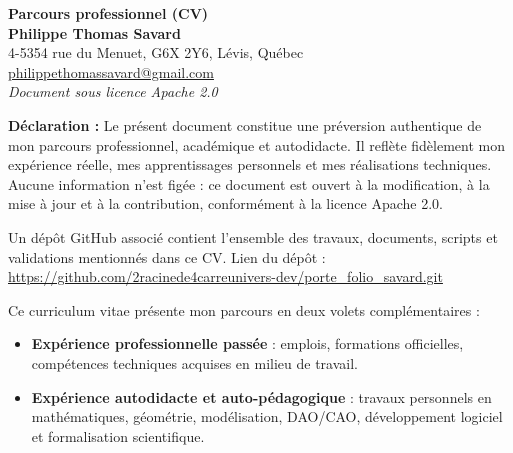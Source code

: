 \documentclass[11pt,a4paper]{article}
\begin{document}
\begin{center}
    {\LARGE \textbf{Parcours professionnel (CV)}}\\[0.5cm]

    \textbf{Philippe Thomas Savard}\\
    4-5354 rue du Menuet, G6X 2Y6, Lévis, Québec\\
    \href{mailto:philippethomassavard@gmail.com}{philippethomassavard@gmail.com}\\[0.3cm]

    \textit{Document sous licence Apache 2.0}\\[0.5cm]
\end{center}

\noindent
\textbf{Déclaration :}  
Le présent document constitue une préversion authentique de mon parcours professionnel, académique et autodidacte.  
Il reflète fidèlement mon expérience réelle, mes apprentissages personnels et mes réalisations techniques.  
Aucune information n’est figée : ce document est ouvert à la modification, à la mise à jour et à la contribution,  
conformément à la licence Apache 2.0.

Un dépôt GitHub associé contient l’ensemble des travaux, documents, scripts et validations mentionnés dans ce CV.  
Lien du dépôt : \url{https://github.com/2racinede4carreunivers-dev/porte_folio_savard.git}

\vspace{0.8cm}

\noindent
Ce curriculum vitae présente mon parcours en deux volets complémentaires :

\begin{itemize}
    \item \textbf{Expérience professionnelle passée} : emplois, formations officielles, compétences techniques acquises en milieu de travail.
    \item \textbf{Expérience autodidacte et auto-pédagogique} : travaux personnels en mathématiques, géométrie, modélisation, DAO/CAO,  
    développement logiciel et formalisation scientifique.
\end{itemize}
\end{document}
